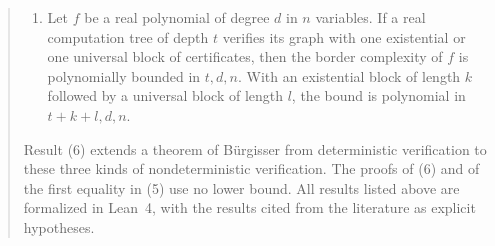 \documentclass[11pt]{amsart}
\theoremstyle{plain}
\theoremstyle{definition}
\theoremstyle{remark}
\begin{document}
\begin{abstract}
\begin{enumerate}[label=\textup{(\arabic*)},leftmargin=2.2em,itemsep=1pt,topsep=3pt,start=6]
\item Let $f$ be a real polynomial of degree $d$ in $n$ variables. If a real computation tree of depth $t$ verifies its graph with one existential or one universal block of certificates, then the border complexity of $f$ is polynomially bounded in $t,d,n$. With an existential block of length $k$ followed by a universal block of length $l$, the bound is polynomial in $t+k+l,d,n$.
\end{enumerate}
Result \textup{(6)} extends a theorem of B\"urgisser from deterministic verification to these three kinds of nondeterministic verification. The proofs of \textup{(6)} and of the first equality in \textup{(5)} use no lower bound. All results listed above are formalized in Lean~4, with the results cited from the literature as explicit hypotheses.
\end{abstract}
\maketitle

\tableofcontents










\appendix




\end{document}

